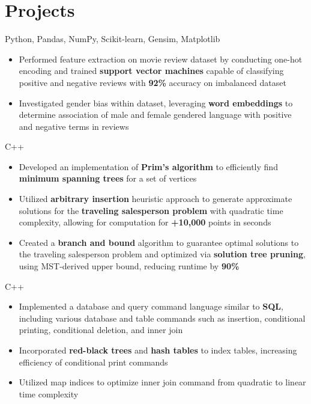 \documentclass[letterpaper,11pt]{article}
\begin{document}
\section{Projects}
{Python, Pandas, NumPy, Scikit-learn, Gensim, Matplotlib}{}
\begin{itemize}[leftmargin=*]
    \item \vspace{-3pt} \small Performed feature extraction on movie review
          dataset by conducting one-hot encoding and trained \textbf{support vector
              machines} capable of classifying positive and negative reviews with
          \textbf{92\%} accuracy on imbalanced dataset
    \item \vspace{-7pt} \small Investigated gender bias within dataset,
          leveraging \textbf{word embeddings} to determine
          association of male and female gendered language with positive and
          negative terms in reviews
\end{itemize}
{C++}{}
\begin{itemize}[leftmargin=*]
    \item \vspace{-3pt} \small Developed an implementation of \textbf{Prim's algorithm}
          to efficiently find \textbf{minimum spanning trees} for a set of vertices
    \item \vspace{-7pt} \small Utilized \textbf{arbitrary insertion} heuristic approach
          to generate approximate solutions for the \textbf{traveling salesperson
              problem} with quadratic time complexity,
          allowing for computation for \textbf{+10,000} points in seconds
    \item \vspace{-7pt} \small Created a \textbf{branch and bound} algorithm to
          guarantee optimal solutions to the traveling salesperson problem and
          optimized via \textbf{solution tree pruning}, using MST-derived upper bound,
          reducing runtime by \textbf{90\%}
\end{itemize}
{C++}{}
\begin{itemize}[leftmargin=*]
    \item \vspace{-3pt} \small Implemented a database and query command
          language similar to \textbf{SQL}, including various database and table commands
          such as insertion, conditional printing, conditional deletion, and
          inner join
    \item \vspace{-7pt} \small Incorporated \textbf{red-black trees} and
          \textbf{hash tables}
          to index tables, increasing efficiency of conditional print commands
    \item \vspace{-7pt} \small Utilized map indices to optimize inner join
          command from quadratic to linear time complexity
\end{itemize}
\end{document}
